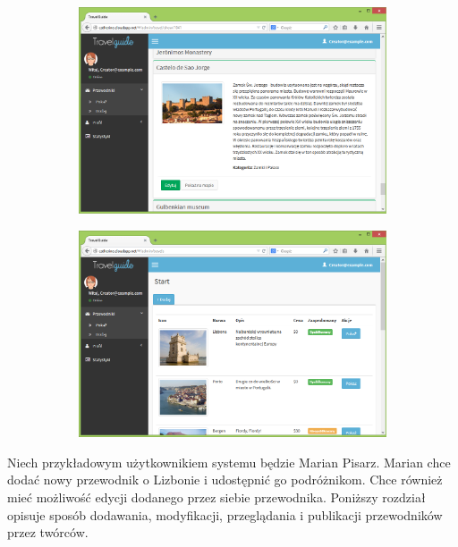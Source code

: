 \documentclass{book}
\begin{document}
		\begin{figure}[H]
			\ContinuedFloat
			
			\begin{subfigure}{1\textwidth}
				\includegraphics[width=\textwidth]{screenshots/web/9edycja3.png}
				\caption{\label{subfig:web_edit3}}	
			\end{subfigure}
			\hfill
			\begin{subfigure}{1\textwidth}
				\includegraphics[width=\textwidth]{screenshots/web/10wszystkie.png}
				\caption{\label{subfig:web_all}}	
			\end{subfigure}
		\end{figure}
		
		Niech przykładowym użytkownikiem systemu będzie Marian Pisarz. Marian chce dodać nowy przewodnik o Lizbonie i udostępnić go podróżnikom. Chce również mieć możliwość edycji dodanego przez siebie przewodnika. Poniższy rozdział opisuje sposób dodawania, modyfikacji, przeglądania i publikacji przewodników przez twórców.
		
\end{document}
